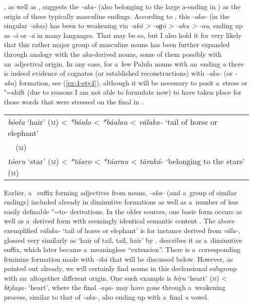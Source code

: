 \citet[15]{morgenstierne1941}, as well as \citet[29]{buddruss1967}, suggests the \iliOIA {} \textit{-aka-} (also belonging to the large a-ending  in \iliOIA) as the origin of these typically masculine endings. According to \citet[222]{masica1991}, this \textit{-aka-} (in the  singular \textit{-akas}) has been  to weakening via \textit{-akō {\textgreater} -aɡō {\textgreater} -ahu {\textgreater} -au}, ending up as \textit{-ō} or \textit{-\={a}} in many \iliNIA languages. That may be so, but I also hold it for very likely that this rather major group of masculine nouns has been further expanded through analogy with the \textit{aka}-derived nouns, some of them possibly with an~adjectival origin. In any case, for a~few Palula nouns with an~ending \textit{u} there is indeed evidence of \iliOIA cognates (or established reconstructions) with \textit{-aka-} (or \textit{-uka}) formation, see (\ref{ex:4-ety4}), although it will be necessary to posit a~stress or "=shift (due to reasons I am not able to formulate now) to have taken place for those words that were stressed on the final  in \iliOIA. 


\begin{exe}
\extab
\label{ex:4-ety4}
\begin{tabular}{ l }
\textit{bóolu} `hair' (\textsc{m}) {\textless} \textit{*báalo} {\textless} \textit{*báalau} {\textless} \textit{vālaka-} `tail of horse or elephant'\\
~~(\textsc{m})\\
\textit{tóoru} `star' (\textsc{m}) {\textless} \textit{*táaro} {\textless} \textit{*táarau} {\textless} \textit{tāraká-} `belonging to the stars' (\textsc{m})
\end{tabular}
\end{exe}


Earlier, a~ suffix forming adjectives from nouns, \textit{-aka-} (and a~group of similar endings) included already in \iliOIA diminutive formations as well as a~number of less easily definable "=to- derivations. In the older sources, one basic form occurs as well as a~derived form with seemingly identical semantic content \citep[1222]{whitney1960}. The above exemplified \textit{vālaka-} `tail of horse or elephant' is for instance derived from \textit{v\'{\={a}}la-}, glossed very similarly as `hair of tail, tail, hair' by \citet[12056]{turner1966}. \citet[222]{masica1991} describes it as a~diminutive suffix, which later became a~meaningless ``extension''. There is a~corresponding \citep[1181, 1222]{whitney1960} feminine formation made with \textit{-ikā} that will be discussed below. However, as pointed out already, we will certainly find nouns in this declensional subgroup with an~altogether different origin. One such example is \textit{híṛu} `heart' (\textsc{m}) {\textless} \textit{hr̥daya-} `heart', where the final \textit{-aya-} may have gone through a~weakening process, similar to that of \textit{-aka-}, also ending up with a~final \textit{u} vowel.


